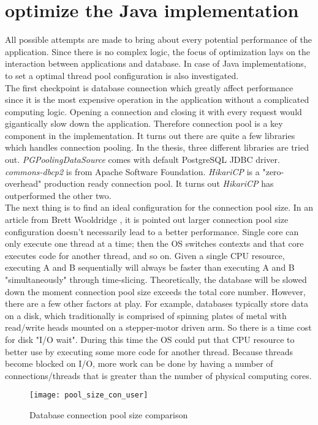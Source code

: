 \section{optimize the Java implementation}
All possible attempts are made to bring about every potential performance of the application. Since there is no complex logic, the focus of optimization lays on the interaction between applications and database. In case of Java implementations, to set a optimal thread pool configuration is also investigated. \\
The first checkpoint is database connection which greatly affect performance since it is the most expensive operation in the application without a complicated computing logic. Opening a connection and closing it with every request would gigantically slow down the application. Therefore connection pool is a key component in the implementation. It turns out there are quite a few libraries which handles connection pooling. In the thesis,  three different libraries are tried out. \textit{PGPoolingDataSource}  \citep{pgpool}   comes with default PostgreSQL JDBC driver. \textit{commons-dbcp2} \citep{dbcp} is from Apache Software Foundation. \textit{HikariCP} is a "zero-overhead" production ready connection pool. It turns out \textit{HikariCP} \citep{hikari} has outperformed the other two. \\
The next thing is to find an ideal configuration for the connection pool size. In an article from Brett Wooldridge \citep{hikari}, it is pointed out larger connection pool size configuration doesn't necessarily lead to a better performance. Single core can only execute one thread at a time; then the OS switches contexts and that core executes code for another thread, and so on. Given a single CPU resource, executing A and B sequentially will always be faster than executing A and B "simultaneously" through time-slicing. Theoretically, the database will be slowed down the moment connection pool size exceeds the total core number. However, there are a few other factors at play. For example, databases typically store data on a disk, which traditionally is comprised of spinning plates of metal with read/write heads mounted on a stepper-motor driven arm. So there is a time cost for disk "I/O wait". During this time the OS could put that CPU resource to better use by executing some more code for another thread. Because threads become blocked on I/O,  more work can be done by having a number of connections/threads that is greater than the number of physical computing cores.
\begin{figure}[h]
	\centering
	\texttt{[image: pool\_size\_con\_user]}
	\caption{Database connection pool size comparison}
	\label{pool-comparison}
\end{figure}
